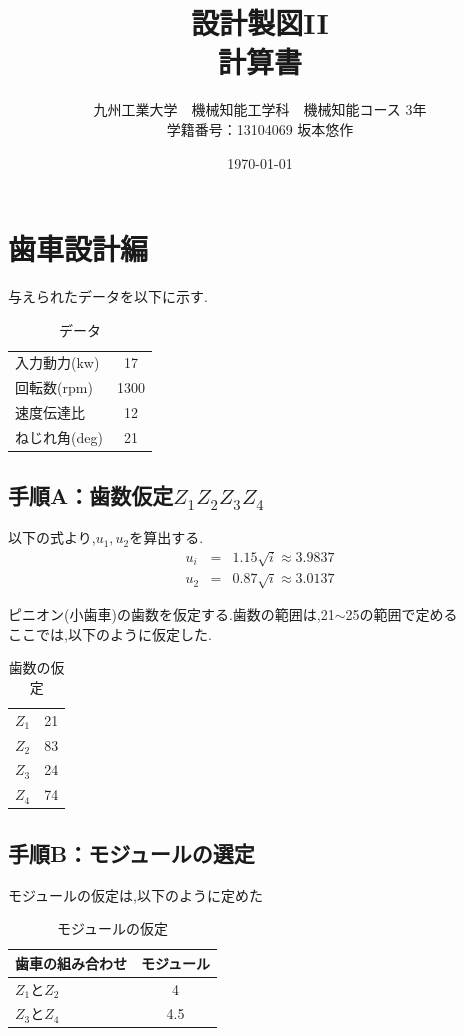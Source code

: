\documentclass[a4j,twoside,openright,11pt]{jreport}
\title{設計製図I\hspace{-.1em}I \\計算書}
\author{九州工業大学　機械知能工学科　機械知能コース 3年\\学籍番号：13104069 坂本悠作}
\date{\today}
\begin{document}
\maketitle
\chapter{歯車設計編}
与えられたデータを以下に示す.
\begin{table}[htb]
\begin{center}
  \caption{データ}
  \begin{tabular}{|l|c|} \hline
    入力動力(kw)&17\\
    回転数(rpm)&1300\\
    速度伝達比&12\\
    ねじれ角(deg)&21\\
    \hline
  \end{tabular}
\end{center}
\end{table}
\section{手順A：歯数仮定$Z_1Z_2Z_3Z_4$ }
以下の式より,$u_1,u_2$を算出する.
\begin{eqnarray}
u_i&=&1.15 \sqrt i \approx 3.9837\nonumber\\
u_2&=&0.87 \sqrt i \approx 3.0137 \nonumber
\end{eqnarray}

ピニオン(小歯車)の歯数を仮定する.歯数の範囲は,21$\sim$25の範囲で定める\\
ここでは,以下のように仮定した.
\begin{table}[htb]
\begin{center}
  \caption{歯数の仮定}
  \begin{tabular}{|l|c|} \hline
    $Z_1$&21\\
    $Z_2$&83\\
    $Z_3$&24\\
    $Z_4$&74\\
    \hline
  \end{tabular}
\end{center}
\end{table}
\section{手順B：モジュールの選定}
モジュールの仮定は,以下のように定めた
\begin{table}[htb]
\begin{center}
  \caption{モジュールの仮定}
  \begin{tabular}{|l|c|} \hline
    歯車の組み合わせ&モジュール\\\hline
    $Z_1とZ_2$&4\\
    $Z_3とZ_4$&4.5\\
    \hline
  \end{tabular}
\end{center}
\end{table}
\end{document}
